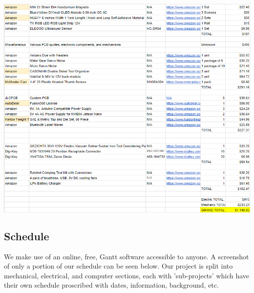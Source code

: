 \documentclass[a4paper, 10pt]{article}
\begin{document}
	\includegraphics[scale=0.9]{Photos/Bills of Material}

	\subsection{Schedule}
	We make use of an online, free, Gantt software accessible to anyone. A screenshot of only a portion of our schedule can be seen below. Our project is split into mechanical, electrical, and computer sections, each with 'sub-projects' which have their own schedule proscribed with dates, information, background, etc.
\end{document}
